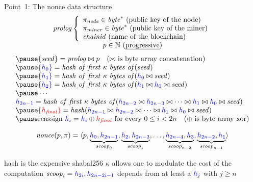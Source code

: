 \documentclass[11pt]{beamer}  %
\newcommand{\nonce}{{\mathit{nonce}}}
\newcommand{\scoop}{{\mathit{scoop}}}
\newcommand{\seed}{{\mathit{seed}}}
\newcommand{\hash}{{\mathit{hash}}}
\newcommand{\hashfirstk}{{\mathit{hash\ of\ first\ \kappa\ bytes\ of}}}
\newcommand{\finalhash}{{h_{\mathit{final}}}}
\begin{document}
\begin{frame}{Point~1: The nonce data structure}
  \vspace*{-2ex}
  \[
  \begin{array}{c}
    \mathit{prolog}
    \left\{\begin{array}{l}
    \pi_{\mathit{node}}\in\mathit{byte}^*\text{ (public key of the node)}\\
    \pi_{\mathit{miner}}\in\mathit{byte}^*\text{ (public key of the miner)}\\
    \mathit{chainid}\text{ (name of the blockchain)}
    \end{array}\right.\\
    p\in\mathbb{N}\text{ (\emph{progressive})}
  \end{array}
  \]
  \[\begin{array}{l}
  \pause
  \seed=\mathit{prolog}\bowtie p\quad\text{($\bowtie$ is byte array concatenation)}\\
  \pause
  {\color{blue} h_0}=\hashfirstk(\seed)\\
  \pause
  {\color{blue} h_1}=\hashfirstk({\color{blue} h_0}\bowtie\seed)\\
  \pause
  {\color{blue} h_2}=\hashfirstk({\color{blue} h_1}\bowtie{\color{blue}  h_0}\bowtie \seed)\\
  \pause
  \cdots\\
  {\color{blue} h_{2n-1}}=\hashfirstk({\color{blue} h_{2n-2}}\bowtie{\color{blue} h_{2n-3}}\bowtie\cdots\bowtie{\color{blue} h_1}\bowtie{\color{blue} h_0}\bowtie \seed)\\
  \pause
  {\color{red}\finalhash}=\hash({\color{blue} h_{2n-1}}\bowtie{\color{blue} h_{2n-2}}\bowtie\cdots\bowtie{\color{blue} h_1}\bowtie{\color{blue} h_0}\bowtie \seed)\\
  \pause
  \text{reassign }{\color{blue} h_i}={\color{blue} h_i}\oplus{\color{red}\finalhash}\text{ for every }0\le i<2n\quad\text{($\oplus$ is byte array xor)}\\
  \end{array}\]

  \pause

  \[
  \nonce(p,\pi)=\langle p,\underbrace{{\color{blue}h_0},{\color{blue}h_{2n-1}}}_{\scoop_0},\underbrace{{\color{blue}h_2},{\color{blue}h_{2n-3}}}_{\scoop_1},\ldots,\underbrace{{\color{blue}h_{2n-4}},{\color{blue}h_3}}_{\scoop_{n-2}},\underbrace{{\color{blue}h_{2n-2}},{\color{blue}h_1}}_{\scoop_{n-1}}\rangle
  \]

  \begin{overprint}
    \centering hash is the expensive shabal256
    \centering $\kappa$ allows one to modulate the cost of the computation
    \centering $\scoop_i={\color{blue}h_{2i}},{\color{blue}h_{2n-2i-1}}$ depends from at least a ${\color{blue}h_j}$ with $j\ge n$
  \end{overprint}

\end{frame}
\end{document}
